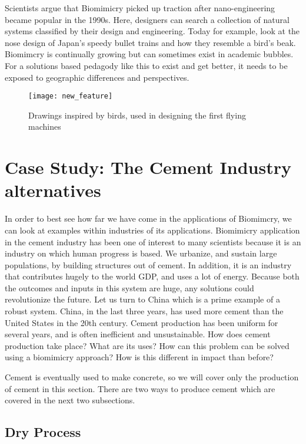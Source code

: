 Scientists argue that Biomimicry picked up traction after nano-engineering became popular in the 1990s. Here, designers can search a collection of natural systems classified by their design and engineering. Today for example, look at the nose design of Japan's speedy bullet trains and how they resemble a bird's beak. Biomimcry is continually growing but can sometimes exist in academic bubbles. For a solutions based pedagody like this to exist and get better, it needs to be exposed to geographic differences and perspectives. 


\begin{figure}
\texttt{[image: new\_feature]}
\caption{Drawings inspired by birds, used in designing the first flying machines}
\label{fig:news_featured}
\end{figure}

\section{Case Study: The Cement Industry alternatives}

In order to best see how far we have come in the applications of Biomimcry, we can look at examples within industries of its applications. Biomimicry application in the cement industry has been one of interest to many scientists because it is an industry on which human progress is based. We urbanize, and sustain large populations, by building structures out of cement. In addition, it is an industry that contributes hugely to the world GDP, and uses a lot of energy. Because both the outcomes and inputs in this system are huge, any solutions could revolutionize the future. Let us turn to China which is a prime example of a robust system.
China, in the last three years, has used more cement than the United States in the 20th century.  Cement production has been uniform for several years, and is often inefficient and unsustainable. How does cement production take place? What are its uses? How can this problem can be solved using a biomimicry approach? How is this different in impact than before?

Cement is eventually used to make concrete, so we will cover only the production of cement in this section. There are two ways to produce cement which are covered in the next two subsections.

\subsection{Dry Process}

